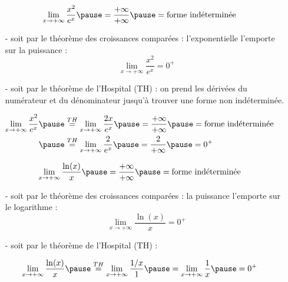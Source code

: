 \documentclass[9pt,handout,professionalfonts,hyperref]{beamer}
\begin{document}
\begin{frame}
$$\lim_{x \to +\infty} \dfrac{x^2}{e^x}\pause =\dfrac{+\infty}{+\infty} \pause = \text{forme indéterminée}$$

\medskip
\begin{itemize}
\pause 	\item[-] soit par le théorème des croissances comparées : \pause l'exponentielle l'emporte sur la puissance : $$\lim_{x \to +\infty} \dfrac{x^2}{e^x}=0^+$$ \newline
\pause 	\item[-] soit par le théorème de l'Hospital (TH) : \pause on prend les dérivées du numérateur et du dénominateur jusqu'à trouver une forme non indéterminée.
\end{itemize}

\[\begin{aligned}
\lim_{x \to +\infty} \dfrac{x^2}{e^x}
\pause &\overset{TH}{=}\lim_{x \to +\infty} \dfrac{2x}{e^x} \pause = \dfrac{+\infty}{+\infty} \pause = \text{forme indéterminée}\\
\pause &\overset{TH}{=} \lim_{x \to +\infty} \dfrac{2}{e^x} \pause = \dfrac{2}{+\infty} \pause =0^+
\end{aligned}\]
\end{frame}

\begin{frame}
$$\lim_{x \to +\infty} \dfrac{\ln(x)}{x}\pause =\dfrac{+\infty}{+\infty}\pause = \text{forme indéterminée}$$

\medskip
\begin{itemize}
\pause 	\item[-] soit par le théorème des croissances comparées : \pause la puissance l'emporte sur le logarithme : $$\lim_{x \to +\infty} \dfrac{\ln(x)}{x}=0^+$$ \newline

\pause 	\item[-] soit par le théorème de l'Hospital (TH) :
\end{itemize}

\[\begin{aligned}
\lim_{x \to +\infty} \dfrac{\ln(x)}{x} \pause \overset{TH}{=} \lim_{x \to +\infty}\dfrac{1/x}{1}\pause =\lim_{x \to +\infty}\dfrac{1}{x}\pause =0^+
\end{aligned}\]

\end{frame}
\end{document}
